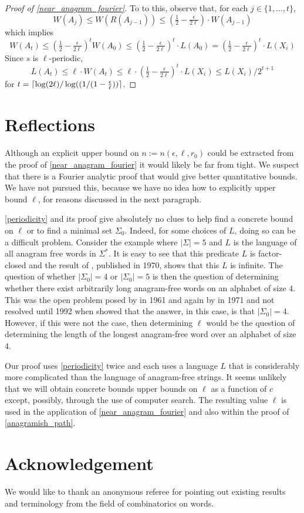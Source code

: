 \documentclass{patmorin}
\begin{document}
\begin{proof}[Proof of \cref{near_anagram_fourier}]
  To to this, observe that, for each $j\in\{1,\ldots,t\}$,
  \begin{equation}
      W(A_j)
        \le W(R(A_{j-1}))
        \le (\tfrac12-\tfrac{\epsilon}{2\ell})\cdot W(A_{j-1})
  \end{equation}
  which implies
  \[
       W(A_t)
       \le (\tfrac12-\tfrac{\epsilon}{2\ell})^t W(A_0) \le (\tfrac12-\tfrac{\epsilon}{2\ell})^t\cdot L(A_0)
       =  (\tfrac12-\tfrac{\epsilon}{2\ell})^t\cdot L(X_i)
  \]
  Since $s$ is $\ell$-periodic,
  \[
        L(A_t)\le \ell\cdot W(A_t) \le \ell\cdot(\tfrac12-\tfrac{\epsilon}{2\ell})^t\cdot L(X_i) \le L(X_i)/2^{t+1}
  \]
  for $t = {\lceil \log(2\ell)/\log((1/(1-\tfrac{\epsilon}{\ell})) \rceil}$.
\end{proof}

\section{Reflections}
\label{reflections}

Although an explicit upper bound on $n:=n(\epsilon,\ell,r_0)$ could be extracted from the proof of \cref{near_anagram_fourier} it would likely be far from tight.  We suspect that there is a Fourier analytic proof that would give better quantitative bounds.  We have not pursued this, because we have no idea how to explicitly upper bound $\ell$, for reasons discussed in the next paragraph.

\cref{periodicity} and its proof give absolutely no clues to help find a concrete bound on $\ell$ or to find a minimal set $\Sigma_0$. Indeed, for some choices of $L$, doing so can be a difficult problem.  Consider the example where $|\Sigma|=5$ and $L$ is the language of all anagram free words in $\Sigma^*$. It is easy to see that this predicate $L$ is factor-closed and the result of \citet{pleasants:non-repetitive}, published in 1970, shows that this $L$ is infinite.  The question of whether $|\Sigma_0|=4$ or $|\Sigma_0|=5$ is then the question of determining whether there exist arbitrarily long anagram-free words on an alphabet of size $4$.  This was the open problem posed by \citet{erdos:some} in 1961 and again by \citet{brown:is} in 1971 and not resolved until 1992 when \citet{keranen:abelian,keranen:powerful} showed that the answer, in this case, is that $|\Sigma_0|=4$.  However, if this were not the case, then determining $\ell$ would be the question of determining the length of the longest anagram-free word over an alphabet of size $4$.

Our proof uses \cref{periodicity} twice and each uses a language $L$ that is considerably more complicated than the language of anagram-free strings. It seems unlikely that we will obtain concrete bounds upper bounds on $\ell$ as a function of $c$ except, possibly, through the use of computer search. The resulting value $\ell$ is used in the application of \cref{near_anagram_fourier} and also within the proof of \cref{anagramish_path}.

\section{Acknowledgement}

We would like to thank an anonymous referee for pointing out existing results and terminology from the field of combinatorics on words.



\end{document}
